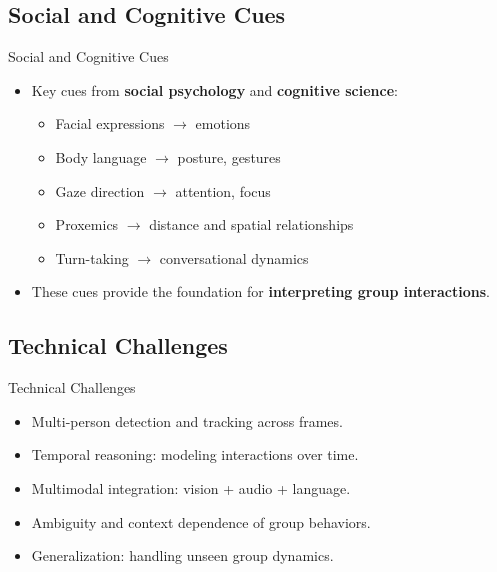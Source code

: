 \documentclass{beamer}
\begin{document}
\subsection{Social and Cognitive Cues}
\begin{frame}{Social and Cognitive Cues}
    \begin{itemize}
        \item Key cues from \textbf{social psychology} and \textbf{cognitive science}:
              \begin{itemize}
                  \item Facial expressions $\rightarrow$ emotions
                  \item Body language $\rightarrow$ posture, gestures
                  \item Gaze direction $\rightarrow$ attention, focus
                  \item Proxemics $\rightarrow$ distance and spatial relationships
                  \item Turn-taking $\rightarrow$ conversational dynamics
              \end{itemize}
        \item These cues provide the foundation for \textbf{interpreting group interactions}.
    \end{itemize}
\end{frame}

\subsection{Technical Challenges}
\begin{frame}{Technical Challenges}
    \begin{itemize}
        \item Multi-person detection and tracking across frames.
        \item Temporal reasoning: modeling interactions over time.
        \item Multimodal integration: vision + audio + language.
        \item Ambiguity and context dependence of group behaviors.
        \item Generalization: handling unseen group dynamics.
    \end{itemize}
\end{frame}
\end{document}
